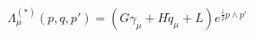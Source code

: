 \begin{equation}
 \Lambda_{\mu}^{(\ast)}(p,q,p')=\left(\textit{G}\gamma_{\mu}+\textit{H}\widetilde{q}_{\mu}
 +\textit{L}\right)e^{\frac{i}{2}p\wedge p'}
 \end{equation}

